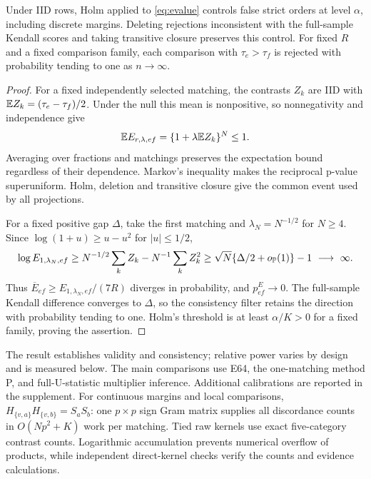 \begin{proposition}\label{prop:evalues}
Under IID rows, Holm applied to \eqref{eq:evalue} controls false strict orders at level $\alpha$, including discrete margins. Deleting rejections inconsistent with the full-sample Kendall scores and taking transitive closure preserves this control. For fixed $R$ and a fixed comparison family, each comparison with $\tau_e>\tau_f$ is rejected with probability tending to one as $n\to\infty$.
\end{proposition}
\begin{proof}
For a fixed independently selected matching, the contrasts $Z_k$ are IID with $\mathbb E Z_k=(\tau_e-\tau_f)/2$. Under the null this mean is nonpositive, so nonnegativity and independence give
\[
 \mathbb E E_{r,\lambda,ef}=\{1+\lambda\mathbb E Z_k\}^N\le1.
\]
Averaging over fractions and matchings preserves the expectation bound regardless of their dependence. Markov's inequality makes the reciprocal p-value superuniform. Holm, deletion and transitive closure give the common event used by all projections.

For a fixed positive gap $\Delta$, take the first matching and $\lambda_N=N^{-1/2}$ for $N\ge4$. Since $\log(1+u)\ge u-u^2$ for $|u|\le1/2$,
\[
 \log E_{1,\lambda_N,ef}\ge N^{-1/2}\sum_k Z_k-N^{-1}\sum_kZ_k^2
 \ge \sqrt N\{\Delta/2+o_{\mathbb P}(1)\}-1\ \longrightarrow\ \infty.
\]
Thus $\overline E_{ef}\ge E_{1,\lambda_N,ef}/(7R)$ diverges in probability, and $p^E_{ef}\to0$. The full-sample Kendall difference converges to $\Delta$, so the consistency filter retains the direction with probability tending to one. Holm's threshold is at least $\alpha/K>0$ for a fixed family, proving the assertion.
\end{proof}
The result establishes validity and consistency; relative power varies by design and is measured below. The main comparisons use E64, the one-matching method P, and full-U-statistic multiplier inference. Additional calibrations are reported in the supplement. For continuous margins and local comparisons, $H_{\{v,a\}}H_{\{v,b\}}=S_aS_b$: one $p\times p$ sign Gram matrix supplies all discordance counts in $O(Np^2+K)$ work per matching. Tied raw kernels use exact five-category contrast counts. Logarithmic accumulation prevents numerical overflow of products, while independent direct-kernel checks verify the counts and evidence calculations.


